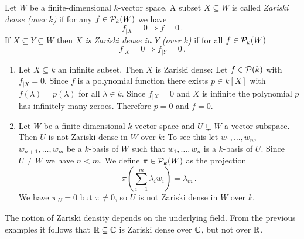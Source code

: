 \begin{defi}
  Let $W$ be a finite-dimensional $k$-vector space.
  A subset $X \subseteq W$ is called \emph{Zariski dense (over $k$)} if for any $f \in \mathcal{P}_k(W)$ we have
  \[
                f_{|X} = 0
    \Rightarrow f = 0 \,.
  \]
  If $X \subseteq Y \subseteq W$ then \emph{$X$ is Zariski dense in $Y$ (over $k$)} if for all $f \in \mathcal{P}_k(W)$
  \[
                f_{|X} = 0
    \Rightarrow f_{|Y} = 0 \,.
  \]
\end{defi}


\begin{expls}
  \begin{enumerate}[label=\emph{\alph*)},leftmargin=*]
    \item 
      Let $X \subseteq k$ an infinite subset.
      Then $X$ is Zariski dense:
      Let $f \in \mathcal{P}(k)$ with $f_{|X} = 0$.
      Since $f$ is a polynomial function there exists $p \in k[X]$ with $f(\lambda) = p(\lambda)$ for all $\lambda \in k$.
      Since $f_{|X} = 0$ and $X$ is infinite the polynomial $p$ has infinitely many zeroes.
      Therefore $p = 0$ and $f = 0$.
    \item
      Let $W$ be a finite-dimensional $k$-vector space and $U \subsetneq W$ a vector subspace.
      Then $U$ is not Zariski dense in $W$ over $k$:
      To see this let $w_1, \dotsc, w_n$, $w_{n+1}, \dotsc, w_m$ be a $k$-basis of $W$ such that $w_1, \dotsc, w_n$ is a $k$-basis of $U$.
      Since $U \neq W$ we have $n < m$.
      We define $\pi \in \mathcal{P}_k(W)$ as the projection
      \[
          \pi\left( \sum_{i=1}^m \lambda_i w_i \right)
        = \lambda_m \,.
      \]
      We have $\pi_{|U} = 0$ but $\pi \neq 0$, so $U$ is not Zariski dense in $W$ over $k$.
  \end{enumerate}
\end{expls}


\begin{warn}
  The notion of Zariski density depends on the underlying field.
  From the previous examples it follows that $\mathbb{R} \subseteq \mathbb{C}$ is Zariski dense over $\mathbb{C}$, but not over $\mathbb{R}$.
\end{warn}



